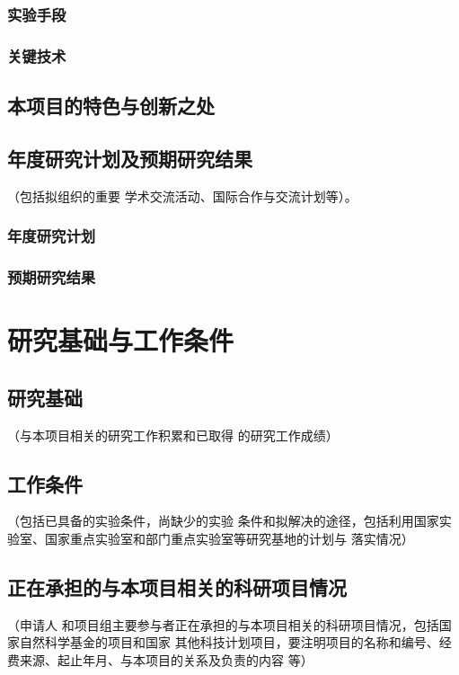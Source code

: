 \documentclass[a4paper,12pt, AutoFakeBold, fontset=adobe]{ctexart}
\begin{document}
\subsubsection{实验手段}

\subsubsection{关键技术}

\subsection{本项目的特色与创新之处}


\subsection{年度研究计划及预期研究结果}{\color{nsfcblue}\kaishu\noindent（包括拟组织的重要
  学术交流活动、国际合作与交流计划等）。}


\subsubsection{年度研究计划}

\subsubsection{预期研究结果}

\section{研究基础与工作条件}

\subsection{研究基础}{\color{nsfcblue}\kaishu\noindent（与本项目相关的研究工作积累和已取得
  的研究工作成绩）}

\subsection{工作条件}{\color{nsfcblue}\kaishu\noindent（包括已具备的实验条件，尚缺少的实验
  条件和拟解决的途径，包括利用国家实验室、国家重点实验室和部门重点实验室等研究基地的计划与
  落实情况）}

\subsection{正在承担的与本项目相关的科研项目情况}{\color{nsfcblue}\kaishu\noindent（申请人
  和项目组主要参与者正在承担的与本项目相关的科研项目情况，包括国家自然科学基金的项目和国家
  其他科技计划项目，要注明项目的名称和编号、经费来源、起止年月、与本项目的关系及负责的内容
  等）}
\end{document}
